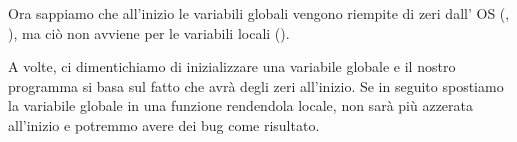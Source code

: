 
Ora sappiamo che all'inizio le variabili globali vengono riempite di zeri dall' \ac{OS}
(, ),
ma ciò non avviene per le variabili locali ().

A volte, ci dimentichiamo di inizializzare una variabile globale e il nostro programma si basa sul fatto che avrà degli zeri all'inizio.
Se in seguito spostiamo la variabile globale in una funzione rendendola locale, non sarà più azzerata all'inizio e potremmo avere dei bug come risultato.
